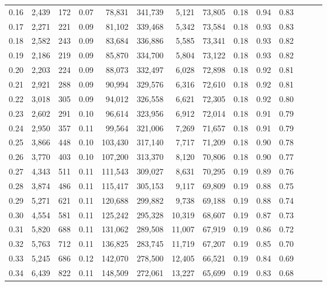 \begin{tabular}{rrrrrrrrrrrrrr}
0.16 &  2,439 &    172 &  0.07 &   78,831 &  341,739 &   5,121 &  73,805 &  0.18 &  0.94 &      0.83 \\
0.17 &  2,271 &    221 &  0.09 &   81,102 &  339,468 &   5,342 &  73,584 &  0.18 &  0.93 &      0.83 \\
0.18 &  2,582 &    243 &  0.09 &   83,684 &  336,886 &   5,585 &  73,341 &  0.18 &  0.93 &      0.82 \\
0.19 &  2,186 &    219 &  0.09 &   85,870 &  334,700 &   5,804 &  73,122 &  0.18 &  0.93 &      0.82 \\
0.20 &  2,203 &    224 &  0.09 &   88,073 &  332,497 &   6,028 &  72,898 &  0.18 &  0.92 &      0.81 \\
0.21 &  2,921 &    288 &  0.09 &   90,994 &  329,576 &   6,316 &  72,610 &  0.18 &  0.92 &      0.81 \\
0.22 &  3,018 &    305 &  0.09 &   94,012 &  326,558 &   6,621 &  72,305 &  0.18 &  0.92 &      0.80 \\
0.23 &  2,602 &    291 &  0.10 &   96,614 &  323,956 &   6,912 &  72,014 &  0.18 &  0.91 &      0.79 \\
0.24 &  2,950 &    357 &  0.11 &   99,564 &  321,006 &   7,269 &  71,657 &  0.18 &  0.91 &      0.79 \\
0.25 &  3,866 &    448 &  0.10 &  103,430 &  317,140 &   7,717 &  71,209 &  0.18 &  0.90 &      0.78 \\
0.26 &  3,770 &    403 &  0.10 &  107,200 &  313,370 &   8,120 &  70,806 &  0.18 &  0.90 &      0.77 \\
0.27 &  4,343 &    511 &  0.11 &  111,543 &  309,027 &   8,631 &  70,295 &  0.19 &  0.89 &      0.76 \\
0.28 &  3,874 &    486 &  0.11 &  115,417 &  305,153 &   9,117 &  69,809 &  0.19 &  0.88 &      0.75 \\
0.29 &  5,271 &    621 &  0.11 &  120,688 &  299,882 &   9,738 &  69,188 &  0.19 &  0.88 &      0.74 \\
0.30 &  4,554 &    581 &  0.11 &  125,242 &  295,328 &  10,319 &  68,607 &  0.19 &  0.87 &      0.73 \\
0.31 &  5,820 &    688 &  0.11 &  131,062 &  289,508 &  11,007 &  67,919 &  0.19 &  0.86 &      0.72 \\
0.32 &  5,763 &    712 &  0.11 &  136,825 &  283,745 &  11,719 &  67,207 &  0.19 &  0.85 &      0.70 \\
0.33 &  5,245 &    686 &  0.12 &  142,070 &  278,500 &  12,405 &  66,521 &  0.19 &  0.84 &      0.69 \\
0.34 &  6,439 &    822 &  0.11 &  148,509 &  272,061 &  13,227 &  65,699 &  0.19 &  0.83 &      0.68 \\

\end{tabular}
